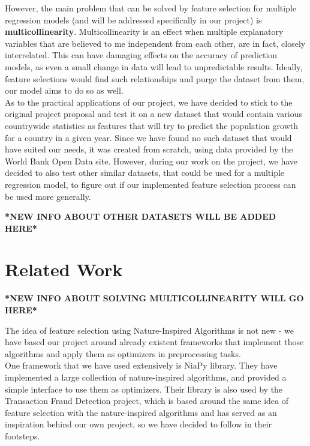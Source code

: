 \documentclass[conference]{IEEEtran}
\begin{document}
However, the main problem that can be solved by feature selection for multiple regression models (and will be addressed specifically in our project) is \textbf{multicollinearity}. Multicollinearity is an effect when multiple explanatory variables that are believed to me independent from each other, are in fact, closely interrelated. This can have damaging effects on the accuracy of prediction models, as even a small change in data will lead to unpredictable results. Ideally, feature selections would find such relationships and purge the dataset from them, our model aims to do so as well.\\

As to the practical applications of our project, we have decided to stick to the original project proposal and test it on a new dataset that would contain various countrywide statistics as features that will try to predict the population growth for a country in a given year. Since we have found no such dataset that would have suited our needs, it was created from scratch, using data provided by the World Bank Open Data site\cite{world_bank_moment}. However, during our work on the project, we have decided to also test other similar datasets, that could be used for a multiple regression model, to figure out if our implemented feature selection process can be used more generally.

\textbf{*NEW INFO ABOUT OTHER DATASETS WILL BE ADDED HERE*}

\section{Related Work}

\textbf{*NEW INFO ABOUT SOLVING MULTICOLLINEARITY WILL GO HERE*}

The idea of feature selection using Nature-Inspired Algorithms is not new - we have based our project around already existent frameworks that implement those algorithms and apply them as optimizers in preprocessing tasks.\\

One framework that we have used extensively is NiaPy library\cite{niapy}. They have implemented a large collection of nature-inspired algorithms, and provided a simple interface to use them as optimizers. Their library is also used by the Transaction Fraud Detection project, which is based around the same idea of feature selection with the nature-inspired algorithms and has served as an inspiration behind our own project, so we have decided to follow in their footsteps.\\
\end{document}
